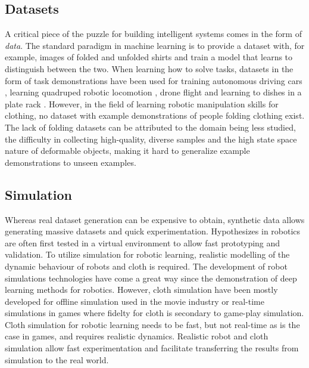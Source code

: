 \documentclass[\home/main.tex]{subfiles}
\begin{document}
\subsection{Datasets}
A critical piece of the puzzle for building intelligent systems comes in the form of \emph{data}. The standard paradigm in machine learning is to provide a dataset with, for example, images of folded and unfolded shirts and train a model that learns to distinguish between the two. When learning how to solve tasks, datasets in the form of task demonstrations have been used for training autonomous driving cars \autocite{bojarski2016end}, learning quadruped robotic locomotion \autocite{peng2020learning}, drone flight \autocite{Giusti2016} and learning to dishes in a plate rack \autocite{Finn2016}. However, in the field of learning robotic manipulation skills for clothing, no dataset with example demonstrations of people folding clothing exist. The lack of folding datasets can be attributed to the domain being less studied, the difficulty in collecting high-quality, diverse samples and the high state space nature of deformable objects, making it hard to generalize example demonstrations to unseen examples.

\subsection{Simulation}
Whereas real dataset generation can be expensive to obtain, synthetic data allows generating massive datasets and quick experimentation. Hypothesizes in robotics are often first tested in a virtual environment to allow fast prototyping and validation. To utilize simulation for robotic learning, realistic modelling of the dynamic behaviour of robots and cloth is required. The development of robot simulations technologies have come a great way since the demonstration of deep learning methods for robotics. However, cloth simulation have been mostly developed for offline simulation used in the movie industry or real-time simulations in games where fidelty for cloth is secondary to game-play simulation. Cloth simulation for robotic learning needs to be fast, but not real-time as is the case in games, and requires realistic dynamics. Realistic robot and cloth simulation allow fast experimentation and facilitate transferring the results from simulation to the real world.
\end{document}
